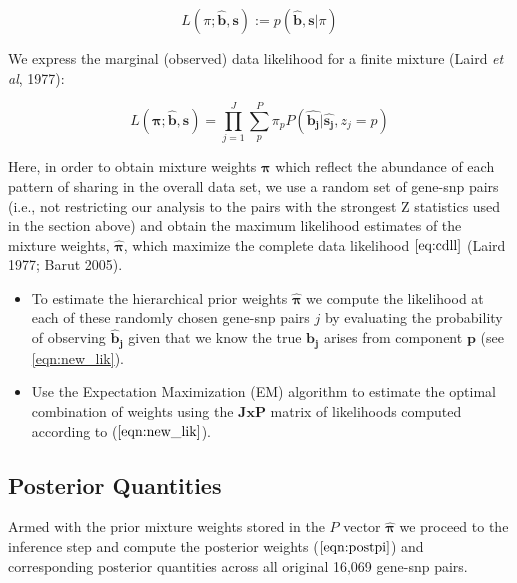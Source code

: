 \begin{enumerate}
\begin{equation}
L(\pi;\hat{\bm{b}}, \bm{s}) := p(\hat{\bm{b}}, \bm{s} | \pi) 
\label{eq:cdll}
\end{equation}

We express the marginal (observed) data likelihood for a finite mixture (Laird \emph{et al}, 1977):

\begin{equation}
L(\bm\pi;{\hat{\bm{b}}},\bm{s}) = \prod_{j=1}^J \sum_{p}^{P} \pi_{p} P(\hat{\bm{b_{j}}} | \hat{\bm{s_{j}}}, z_{j}=p)
\label{eq:pihat}
\end{equation}

Here, in order to obtain mixture weights $\bm{\pi}$ which reflect the abundance of each pattern of sharing in the overall data set, we use a random set of gene-snp pairs (i.e., not restricting our analysis to the pairs with the strongest Z statistics used in the section above) and obtain the maximum likelihood estimates of the mixture weights, $\hat{\bm{\pi}}$, which maximize the complete data likelihood $\ref{eq:cdll}$ (Laird 1977; Barut 2005).

\begin{itemize}
\item  To estimate the hierarchical prior weights $\hat{\bm{\pi}}$ we compute the likelihood at each of these randomly chosen gene-snp pairs $j$ by evaluating the probability of observing $\bm{\hat{b}_{j}}$ given that we know the true $\bm{b_{j}}$ arises from component $\textbf{p}$ (see \ref{eqn:new_lik}).
\item  Use the Expectation Maximization (EM) algorithm to estimate the optimal combination of weights using the  $\textbf{JxP}$ matrix of likelihoods computed according to ($\ref{eqn:new_lik}$).
\end{itemize}


\subsection{Posterior Quantities}\label{sssec:posteriors}

Armed with the prior mixture weights stored in the $P$ vector $\hat{\bm{\pi}}$ we proceed to the inference step and compute the posterior weights ($\ref{eqn:postpi}$) and corresponding posterior quantities across all original 16,069 gene-snp pairs. %


\end{enumerate}
